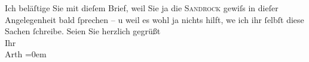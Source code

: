 \begin{ledgroupsized}[t]{13cm}
               Ich beläſtige Sie {\pb}mit dieſem
               Brief, weil Sie ja die \textsc{Sandrock} gewiſs in dieſer Angelegenheit bald ſprechen – u weil es wohl ja nichts hilft,
                  we{\geminationn} ich ihr ſelbſt diese Sachen ſchreibe. \pend
           \pstart
           Seien Sie herzlich gegrüßt {\\[\baselineskip]}Ihr {\\[\baselineskip]}\spacefill\mbox{Arth}\pend
           \leftskip=0em{}
         
         \endnumbering{}\end{ledgroupsized}\begin{anhang}\end{anhang}\newcommand{\dateiname}{L02995}\newcommand{\titel}{Arthur Schnitzler an Felix Salten, 10. 1. 1905}\newcommand{\editorInnen}{Martin Anton Müller und Laura Untner}
      
